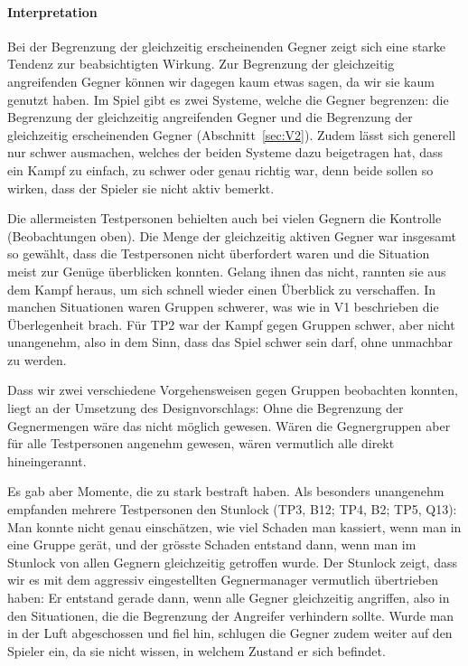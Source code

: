\documentclass[../Main.tex]{subfiles}
\begin{document}
\paragraph{Interpretation}
Bei der Begrenzung der gleichzeitig erscheinenden Gegner zeigt sich eine starke Tendenz zur beabsichtigten Wirkung. Zur Begrenzung der gleichzeitig angreifenden Gegner können wir dagegen kaum etwas sagen, da wir sie kaum genutzt haben. Im Spiel gibt es zwei Systeme, welche die Gegner begrenzen: die Begrenzung der gleichzeitig angreifenden Gegner und die Begrenzung der gleichzeitig erscheinenden Gegner (Abschnitt~\ref{sec:V2}). Zudem lässt sich generell nur schwer ausmachen, welches der beiden Systeme dazu beigetragen hat, dass ein Kampf zu einfach, zu schwer oder genau richtig war, denn beide sollen so wirken, dass der Spieler sie nicht aktiv bemerkt.

Die allermeisten Testpersonen behielten auch bei vielen Gegnern die Kontrolle (Beobachtungen oben). Die Menge der gleichzeitig aktiven Gegner war insgesamt so gewählt, dass die Testpersonen nicht überfordert waren und die Situation meist zur Genüge überblicken konnten. Gelang ihnen das nicht, rannten sie aus dem Kampf heraus, um sich schnell wieder einen Überblick zu verschaffen. In manchen Situationen waren Gruppen schwerer, was wie in V1 beschrieben die Überlegenheit brach. Für TP2 war der Kampf gegen Gruppen schwer, aber nicht unangenehm, also in dem Sinn, dass das Spiel schwer sein darf, ohne unmachbar zu werden.

Dass wir zwei verschiedene Vorgehensweisen gegen Gruppen beobachten konnten, liegt an der Umsetzung des Designvorschlags: Ohne die Begrenzung der Gegnermengen wäre das nicht möglich gewesen. Wären die Gegnergruppen aber für alle Testpersonen angenehm gewesen, wären vermutlich alle direkt hineingerannt.

Es gab aber Momente, die zu stark bestraft haben. Als besonders unangenehm empfanden mehrere Testpersonen den Stunlock (TP3, B12; TP4, B2; TP5, Q13): Man konnte nicht genau einschätzen, wie viel Schaden man kassiert, wenn man in eine Gruppe gerät, und der grösste Schaden entstand dann, wenn man im Stunlock von allen Gegnern gleichzeitig getroffen wurde. Der Stunlock zeigt, dass wir es mit dem aggressiv eingestellten Gegnermanager vermutlich übertrieben haben: Er entstand gerade dann, wenn alle Gegner gleichzeitig angriffen, also in den Situationen, die die Begrenzung der Angreifer verhindern sollte. Wurde man in der Luft abgeschossen und fiel hin, schlugen die Gegner zudem weiter auf den Spieler ein, da sie nicht wissen, in welchem Zustand er sich befindet.
\end{document}
